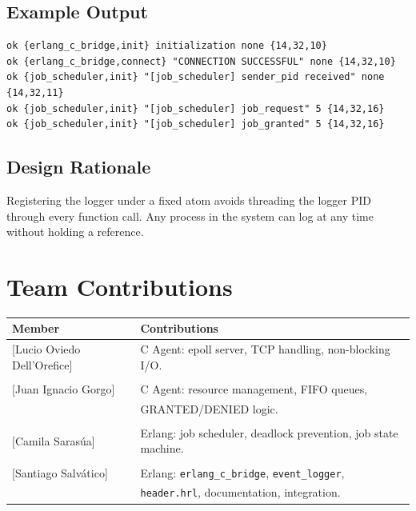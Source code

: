 \documentclass[12pt,a4paper]{article}
\begin{document}
\subsection{Example Output}

\begin{lstlisting}
ok {erlang_c_bridge,init} initialization none {14,32,10}
ok {erlang_c_bridge,connect} "CONNECTION SUCCESSFUL" none {14,32,10}
ok {job_scheduler,init} "[job_scheduler] sender_pid received" none {14,32,11}
ok {job_scheduler,init} "[job_scheduler] job_request" 5 {14,32,16}
ok {job_scheduler,init} "[job_scheduler] job_granted" 5 {14,32,16}
\end{lstlisting}

\subsection{Design Rationale}

Registering the logger under a fixed atom avoids threading the logger PID
through every function call. Any process in the system can log at any time
without holding a reference.

\section{Team Contributions}

\begin{center}
\begin{tabular}{ll}
\toprule
\textbf{Member} & \textbf{Contributions} \\
\midrule
{[Lucio Oviedo Dell'Orefice]} & C Agent: epoll server, TCP handling, non-blocking I/O. \\\\
{[Juan Ignacio Gorgo]} & C Agent: resource management, FIFO queues,\\
			& GRANTED/DENIED logic. \\\\
{[Camila Sarasúa]} & Erlang: job scheduler, deadlock prevention, job state machine. \\\\
{[Santiago Salvático]} & Erlang: \texttt{erlang\_c\_bridge}, \texttt{event\_logger}, \\
             & \texttt{header.hrl}, documentation, integration. \\
\bottomrule
\end{tabular}
\end{center}
\end{document}
